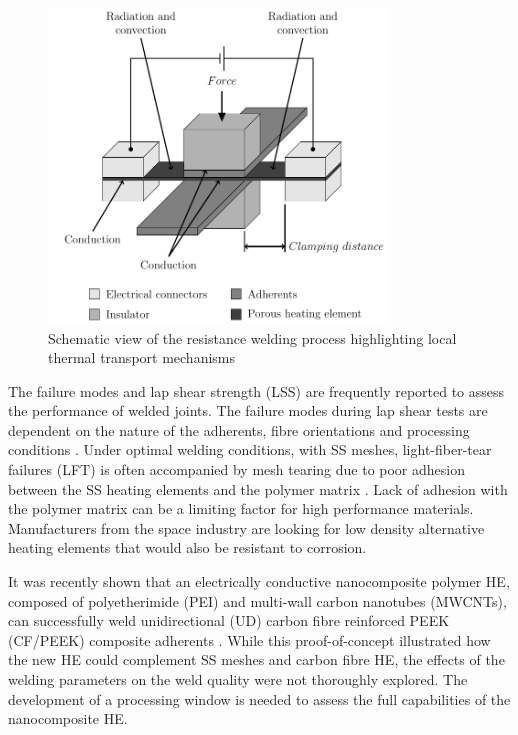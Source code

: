 \documentclass[review,times,sagev,doublespace]{sagej}
\begin{document}
\begin{figure}[ht]
	\center
	\includegraphics[width=90mm]{Fig1}
	\caption{Schematic view of the resistance welding process highlighting local thermal transport mechanisms \cite{Brassard2019b}}
	\label{fig:Fig1}
\end{figure} 

{
The failure modes and lap shear strength (LSS) are frequently reported to assess the performance of welded joints. 
The failure modes during lap shear tests are dependent on the nature of the adherents, fibre orientations and processing conditions \cite{Shi2013a}. 
Under optimal welding conditions, with SS meshes, light-fiber-tear failures (LFT) is often accompanied by mesh tearing due to poor adhesion between the SS heating elements and the polymer matrix \cite{Shi2014,Dube2007,Dube2012a,Dube2009a}. 
Lack of adhesion with the polymer matrix can be a limiting factor for high performance materials. 
Manufacturers from the space industry are looking for low density alternative heating elements that would also be resistant to corrosion. 
}

It was recently shown that an electrically conductive nanocomposite polymer HE{, composed of polyetherimide (PEI) and multi-wall carbon nanotubes (MWCNTs),} can successfully weld unidirectional (UD) carbon fibre reinforced PEEK (CF/PEEK) composite adherents \cite{Brassard2019a}. 
While this proof-of-concept illustrated how the new HE could complement SS meshes and carbon fibre HE, the effects of the welding parameters on the weld quality were not thoroughly explored. 
The development of a processing window is needed to assess the full capabilities of the nanocomposite HE. 
\end{document}
